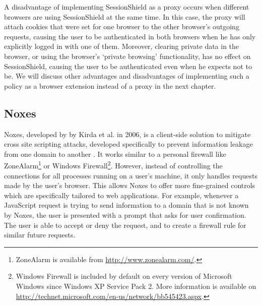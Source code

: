A disadvantage of implementing SessionShield as a proxy occurs when different browsers are using SessionShield at the same time. In this case, the proxy will attach cookies that were set for one browser to the other browser's outgoing requests, causing the user to be authenticated in both browsers when he has only explicitly logged in with one of them. Moreover, clearing private data in the browser, or using the browser's `private browsing' functionality, has no effect on SessionShield, causing the user to be authenticated even when he expects not to be. We will discuss other advantages and disadvantages of implementing such a policy as a browser extension instead of a proxy in the next chapter.

\subsection{Noxes}\label{noxes}

Noxes, developed by by Kirda et al. in 2006, is a client-side solution to mitigate cross site scripting attacks, developed specifically to prevent information leakage from one domain to another \cite{Kirda2006}. It works similar to a personal firewall like ZoneAlarm\footnote{ZoneAlarm is available from \url{http://www.zonealarm.com/}.} or Windows Firewall\footnote{Windows Firewall is included by default on every version of Microsoft Windows since Windows XP Service Pack 2. More information is available on \url{http://technet.microsoft.com/en-us/network/bb545423.aspx}.}. However, instead of controlling the connections for all processes running on a user's machine, it only handles requests made by the user's browser. This allows Noxes to offer more fine-grained controls which are specifically tailored to web applications. For example, whenever a JavaScript request is trying to send information to a domain that is not known by Noxes, the user is presented with a prompt that asks for user confirmation. The user is able to accept or deny the request, and to create a firewall rule for similar future requests.

